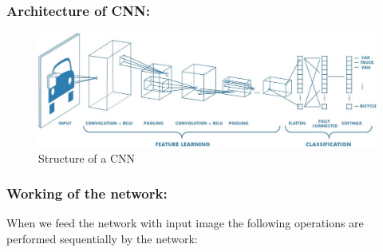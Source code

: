      \subsubsection{\textbf{Architecture of CNN:}}
   
      \begin{figure}[h]
    \centering
    \includegraphics[width=1\textwidth]{thesis_template/images/CNN.jpeg}
    \caption{Structure of a CNN }
    \label{}
    \end{figure}
 \newpage  \subsubsection{\textbf{Working of the network:}}
     When we feed the network with input image the following operations are performed sequentially by the network:

